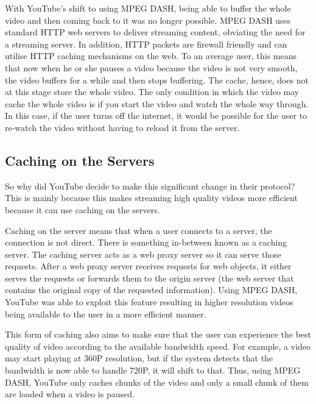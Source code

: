 With YouTube's shift to using MPEG DASH, being able to buffer the whole video and then coming back to it was no longer possible. MPEG DASH uses standard HTTP web servers to deliver streaming content, obviating the need for a streaming server. In addition, HTTP packets are firewall friendly and can utilise HTTP caching mechanisms on the web. To an average user, this means that now when he or she pauses a video because the video is not very smooth, the video buffers for a while and then stops buffering. The cache, hence, does not at this stage store the whole video. The only condition in which the video may cache the whole video is if you start the video and watch the whole way through. In this case, if the user turns off the internet, it would be possible for the user to re-watch the video without having to reload it from the server.

\subsection{Caching on the Servers}
So why did YouTube decide to make this significant change in their protocol? This is mainly because this makes streaming high quality videos more efficient because it can use caching on the servers.

Caching on the server means that when a user connects to a server, the connection is not direct. There is something in-between known as a caching server. The caching server acts as a web proxy server so it can serve those requests. After a web proxy server receives requests for web objects, it either serves the requests or forwards them to the origin server (the web server that contains the original copy of the requested information). Using MPEG DASH, YouTube was able to exploit this feature resulting in higher resolution videos being available to the user in a more efficient manner.

This form of caching also aims to make sure that the user can experience the best quality of video according to the available bandwidth speed. For example, a video may start playing at 360P resolution, but if the system detects that the bandwidth is now able to handle 720P, it will shift to that. Thus, using MPEG DASH, YouTube only caches chunks of the video and only a small chunk of them are loaded when a video is paused. 
